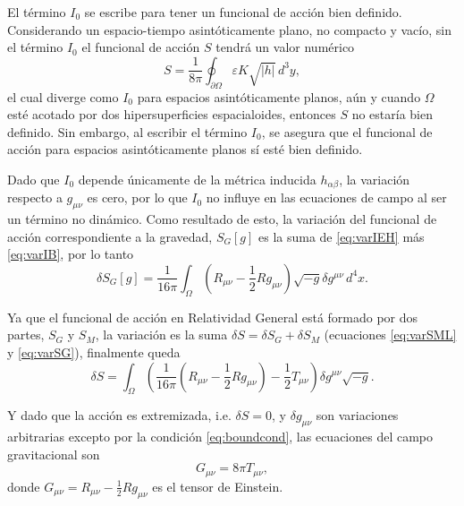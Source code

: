 El término $I_{0}$ se escribe para tener un funcional de acción bien definido. Considerando un espacio-tiempo asintóticamente plano, no compacto y vacío, sin el término $I_{0}$ el funcional de acción $S$ tendrá un valor numérico
%
\begin{equation}
\label{eq:SGI0}
S = \frac{1}{8 \pi} \oint_{\partial \Omega} \varepsilon K \sqrt{|h|} \, d^{3} y,
\end{equation}
%
el cual diverge como $I_{0}$ para espacios asintóticamente planos, aún y cuando $\Omega$ esté acotado por dos hipersuperficies espacialoides, entonces $S$ no estaría bien definido. Sin embargo, al escribir el término $I_{0}$, se asegura que el funcional de acción para espacios asintóticamente planos sí esté bien definido.

Dado que $I_{0}$ depende únicamente de la métrica inducida $h_{\alpha \beta}$, la variación respecto a $g_{\mu \nu}$ es cero, por lo que $I_{0}$ no influye en las ecuaciones de campo al ser un término no dinámico. Como resultado de esto, la variación del funcional de acción correspondiente a la gravedad, $S_{G} [g]$ es la suma de \eqref{eq:varIEH} más \eqref{eq:varIB}, por lo tanto
%
\begin{equation}
\label{eq:varSG}
\delta S_{G} [g] = \frac{1}{16 \pi} \int_{\Omega} \left( R_{\mu \nu} - \frac{1}{2} R g_{\mu \nu} \right) \sqrt{-g} \delta g^{\mu \nu} \, d^{4} x.
\end{equation}

Ya que el funcional de acción en Relatividad General está formado por dos partes, $S_{G}$ y $S_{M}$, la variación es la suma $\delta S = \delta S_{G} + \delta S_{M}$ (ecuaciones \eqref{eq:varSML} y \eqref{eq:varSG}), finalmente queda
%
\begin{equation}
\label{eq:varSSGSM}
\delta S = \int_{\Omega} \left( \frac{1}{16 \pi} (R_{\mu \nu} - \frac{1}{2} R g_{\mu \nu}) - \frac{1}{2} T_{\mu \nu} \right) \delta g^{\mu \nu} \sqrt{-g}.
\end{equation}

Y dado que la acción es extremizada, i.e. $\delta S = 0$, y $\delta g_{\mu \nu}$ son variaciones arbitrarias excepto por la condición \eqref{eq:boundcond}, las ecuaciones del campo gravitacional son
%
\begin{equation}
\label{eq:Einstein}
G_{\mu \nu} = 8 \pi T_{\mu \nu},
\end{equation}
%
donde $G_{\mu \nu} = R_{\mu \nu} - \frac{1}{2} R g_{\mu \nu}$ es el tensor de Einstein.
